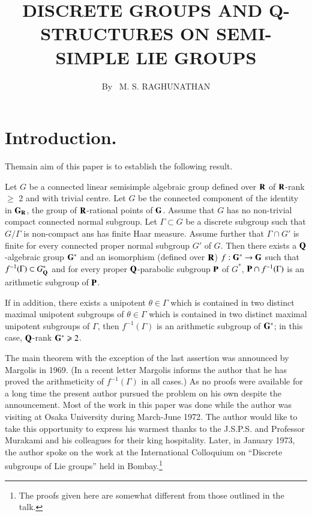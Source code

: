 \title{DISCRETE GROUPS AND Q-STRUCTURES ON SEMI-SIMPLE LIE GROUPS}

\author{By~ M. S. RAGHUNATHAN}

\date{}
\maketitle


\setcounter{page}{241}
\setcounter{pageoriginal}{224}

\section*{Introduction.} The\pageoriginale main aim of this paper is to establish the following result.

\begin{maintheorem*}
Let $G$ be a connected linear semisimple algebraic group defined over $\mathbf{R}$ of $\mathbf{R}$-rank $\geqslant$ 2 and with trivial centre. Let $G$ be the connected component of the identity in $\mathbf{G}_{\mathbf{R}}$, the group of $\mathbf{R}$-rational points of $\mathbf{G}$. Assume that $G$ has no non-trivial compact connected normal subgroup. Let $\Gamma \subset G$ be a discrete subgroup such that $G/\Gamma$ is non-compact ans has finite Haar measure. Assume further that $\Gamma \cap G'$ is finite for every connected proper normal subgroup $G'$ of $G$. Then there exists a $\mathbf{Q}$-algebraic group $\mathbf{G}^\ast$ and an isomorphism (defined over $\mathbf{R}$)  $f: \mathbf{G}^\ast \to \mathbf{G}$ such that $f^{-1} (\Gamma) \subset G^\ast_{\mathbf{Q}}$ and for every proper $\mathbf{Q}$-parabolic subgroup $\mathbf{P}$ of $G^\ast$, $\mathbf{P} \cap f^{-1} (\Gamma)$ is an arithmetic subgroup of $\mathbf{P}$.

If in addition, there exists a unipotent $\theta \in \Gamma$ which is contained in two distinct maximal unipotent subgroups of $\theta \in \Gamma$ which is contained in two distinct maximal unipotent subgroups of $\Gamma$, then $f^{-1}(\Gamma)$ is an arithmetic subgroup of $\mathbf{G}^\ast$; in this case, $\mathbf{Q}$-rank $\mathbf{G}^\ast \geqslant 2$.
\end{maintheorem*}

The main theorem with the exception of the last assertion was announced by Margolis \cite{art9-margolis-1} in 1969. (In a recent letter Margolis informs the author that he has proved the arithmeticity of $f^{-1}(\Gamma)$ in all cases.) As no proofs were available for a long time the present author pursued the problem on his own despite the announcement. Most of the work in this paper was done while the author was visiting at Osaka University during March-June 1972. The author would like to take this opportunity to express his warmest thanks to the J.S.P.S. and Professor Murakami and his colleagues for their king hospitality. Later, in January 1973, the author spoke on the work at the International Colloquium on ``Discrete subgroups of Lie groups'' held in Bombay.\footnote{The proofs given here are somewhat different from those outlined in the talk.}

